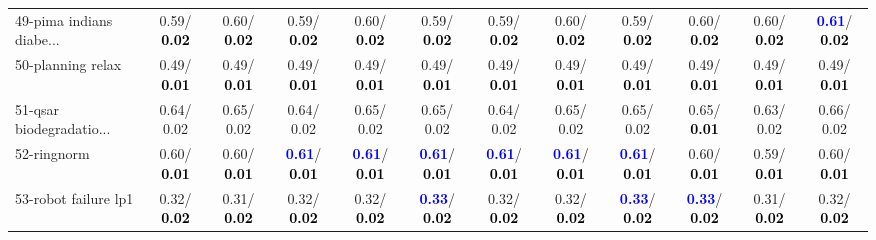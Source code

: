\begin{table}[h]
\begin{center}
{\begin{tabular}{lc|c|c|c|c|c|c|c|c|c|c}
49-pima indians diabe... &   0.59/\textcolor{black}{\textbf{  0.02}} &   0.60/\textcolor{black}{\textbf{  0.02}} &   0.59/\textcolor{black}{\textbf{  0.02}} &   0.60/\textcolor{black}{\textbf{  0.02}} &   0.59/\textcolor{black}{\textbf{  0.02}} &   0.59/\textcolor{black}{\textbf{  0.02}} &   0.60/\textcolor{black}{\textbf{  0.02}} &   0.59/\textcolor{black}{\textbf{  0.02}} &   0.60/\textcolor{black}{\textbf{  0.02}} &   0.60/\textcolor{black}{\textbf{  0.02}} & \textcolor{blue}{\textbf{  0.61}}/\textcolor{black}{\textbf{  0.02}} \\
50-planning relax &   0.49/\textcolor{black}{\textbf{  0.01}} &   0.49/\textcolor{black}{\textbf{  0.01}} &   0.49/\textcolor{black}{\textbf{  0.01}} &   0.49/\textcolor{black}{\textbf{  0.01}} &   0.49/\textcolor{black}{\textbf{  0.01}} &   0.49/\textcolor{black}{\textbf{  0.01}} &   0.49/\textcolor{black}{\textbf{  0.01}} &   0.49/\textcolor{black}{\textbf{  0.01}} &   0.49/\textcolor{black}{\textbf{  0.01}} &   0.49/\textcolor{black}{\textbf{  0.01}} &   0.49/\textcolor{black}{\textbf{  0.01}} \\
51-qsar biodegradatio... &   0.64/  0.02 &   0.65/  0.02 &   0.64/  0.02 &   0.65/  0.02 &   0.65/  0.02 &   0.64/  0.02 &   0.65/  0.02 &   0.65/  0.02 &   0.65/\textcolor{black}{\textbf{  0.01}} &   0.63/  0.02 &   0.66/  0.02 \\
52-ringnorm &   0.60/\textcolor{black}{\textbf{  0.01}} &   0.60/\textcolor{black}{\textbf{  0.01}} & \textcolor{blue}{\textbf{  0.61}}/\textcolor{black}{\textbf{  0.01}} & \textcolor{blue}{\textbf{  0.61}}/\textcolor{black}{\textbf{  0.01}} & \textcolor{blue}{\textbf{  0.61}}/\textcolor{black}{\textbf{  0.01}} & \textcolor{blue}{\textbf{  0.61}}/\textcolor{black}{\textbf{  0.01}} & \textcolor{blue}{\textbf{  0.61}}/\textcolor{black}{\textbf{  0.01}} & \textcolor{blue}{\textbf{  0.61}}/\textcolor{black}{\textbf{  0.01}} &   0.60/\textcolor{black}{\textbf{  0.01}} &   0.59/\textcolor{black}{\textbf{  0.01}} &   0.60/\textcolor{black}{\textbf{  0.01}} \\
53-robot failure lp1 &   0.32/\textcolor{black}{\textbf{  0.02}} &   0.31/\textcolor{black}{\textbf{  0.02}} &   0.32/\textcolor{black}{\textbf{  0.02}} &   0.32/\textcolor{black}{\textbf{  0.02}} & \textcolor{blue}{\textbf{  0.33}}/\textcolor{black}{\textbf{  0.02}} &   0.32/\textcolor{black}{\textbf{  0.02}} &   0.32/\textcolor{black}{\textbf{  0.02}} & \textcolor{blue}{\textbf{  0.33}}/\textcolor{black}{\textbf{  0.02}} & \textcolor{blue}{\textbf{  0.33}}/\textcolor{black}{\textbf{  0.02}} &   0.31/\textcolor{black}{\textbf{  0.02}} &   0.32/\textcolor{black}{\textbf{  0.02}} \\ \hline

\end{tabular}}
\end{center}
\end{table}
